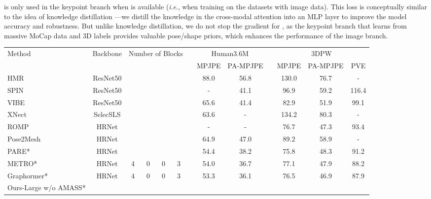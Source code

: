 \documentclass{article}
\newcommand{\ie}{\textit{i}.\textit{e}.}
\begin{document}
 is only used in the keypoint branch when  is available (\ie, when training on the datasets with image data). 
This loss is conceptually similar to the idea of knowledge distillation \cite{hinton2015distilling}---we distill the knowledge in the cross-modal attention into an MLP layer to improve the model accuracy and robustness. 
But unlike knowledge distillation, we do not stop the gradient for , as the keypoint branch that learns from massive MoCap data and 3D labels provides valuable pose/shape priors, which enhances the performance of the image branch. 

\begin{table*}[t]
\centering
\resizebox{\textwidth}{!}
{
\begin{tabular}{lcccccccccccc}
\toprule
\multirow{2}{*}{Method} & \multirow{2}{*}{Backbone} & \multicolumn{4}{c}{Number of Blocks} && \multicolumn{2}{c}{Human3.6M}  && \multicolumn{3}{c}{3DPW}\\
\cline{3-6}\cline{8-9}\cline{11-13}
  &  &  & & & && MPJPE  &  PA-MPJPE && MPJPE  &  PA-MPJPE &  PVE \\ 
\midrule
HMR \cite{kanazawa2018endtoend}         
& ResNet50 & & & & &&    88.0      & 56.8      &&   130.0     & 76.7  &-   \\
SPIN \cite{kolotouros2019learning}      
& ResNet50 & & & & &&      -       & 41.1      &&  96.9      & 59.2  & 116.4   \\
VIBE \cite{kocabas2019vibe}             
& ResNet50 & & & & &&    65.6      & 41.4      &&   82.9      & 51.9  & 99.1   \\
XNect \cite{mehta2020xnect}            
& SelecSLS & & & & &&     63.6      & -         &&   134.2     & 80.3  &-    \\
ROMP \cite{sun2021monocular}            
& HRNet & & & & &&     -      & -         &&    76.7    &  47.3 &93.4      \\
Pose2Mesh \cite{choi2020pose2mesh}
& HRNet & & & & &&   64.9      & 47.0         &&   89.2     & 58.9  &-    \\
PARE* \cite{kocabas2021pare} 
& HRNet & & & & &&     54.4      & 38.2         &&   75.8    & 48.3  & 91.2    \\
METRO* \cite{lin2020end}             
& HRNet & 4 & 0 & 0 & 3 &&        54.0      & 36.7      &&   77.1       & 47.9   & 88.2  \\ 
Graphormer* \cite{lin2021-mesh-graphormer}             
& HRNet & 4 & 0 & 0 & 3 &&        53.3      & 36.1      &&   76.5 & 46.9  & 87.9   \\
Ours-Large w/o AMASS*                  

\end{tabular}}
\end{table*}
\end{document}
